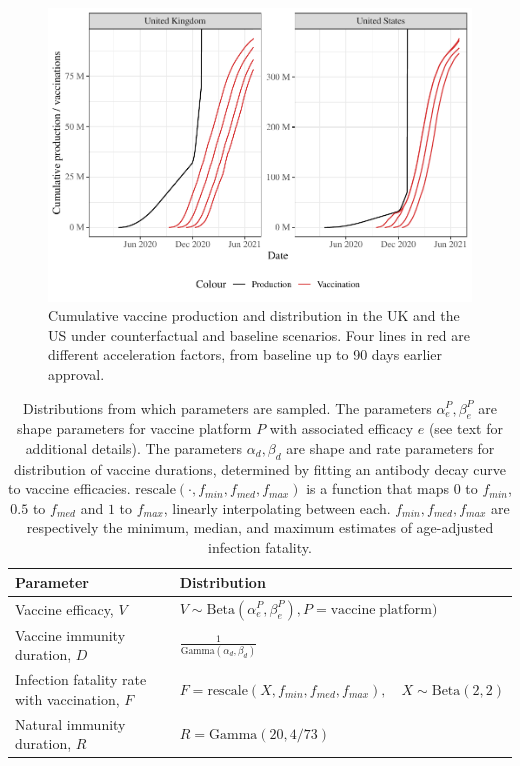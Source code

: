 \documentclass{article}
\begin{document}
\appendix


\setcounter{table}{0} \renewcommand{\thetable}{S\arabic{table}} \setcounter{figure}{0} \renewcommand{\thefigure}{S\arabic{figure}}

\begin{figure}[H]

{\centering \includegraphics[height=0.4\textheight,]{_main_files/figure-latex/prod-cap-1}

}

\caption{Cumulative vaccine production and distribution in the UK and the US under counterfactual and baseline scenarios. Four lines in red are different acceleration factors, from baseline up to 90 days earlier approval.}\label{fig:prod-cap}
\end{figure}

\begin{table}

\caption{\label{tab:trajectory-sampling-parameters}Distributions from which parameters are sampled. The parameters $\alpha_e^P, \beta_e^P$ are shape parameters for vaccine platform $P$ with associated efficacy $e$ (see text for additional details). The parameters $\alpha_d, \beta_d$ are shape and rate parameters for distribution of vaccine durations, determined by fitting an antibody decay curve to vaccine efficacies. $\mathrm{rescale}(\cdot, f_{min}, f_{med}, f_{max})$ is a function that maps $0$ to $f_{min}$, $0.5$ to $f_{med}$ and $1$ to $f_{max}$, linearly interpolating between each. $f_{min}, f_{med}, f_{max}$ are respectively the minimum, median, and maximum estimates of age-adjusted infection fatality.}
\centering
\begin{tabular}[t]{ll}
\toprule
Parameter & Distribution\\
\midrule
Vaccine efficacy, $V$ & $V\sim \mathrm{Beta}(\alpha_{e}^P, \beta_{e}^P), P = \mathrm{vaccine\; platform})$\\
Vaccine immunity duration, $D$ & $\frac{1}{\mathrm{Gamma}(\alpha_{d}, \beta_d)}$\\
Infection fatality rate with vaccination, $F$ & $F = \mathrm{rescale}(X,f_{min}, f_{med}, f_{max}), \quad X\sim \mathrm{Beta}(2,2)$\\
Natural immunity duration, $R$ & $R = \mathrm{Gamma}(20, 4/73)$\\
\bottomrule
\end{tabular}
\end{table}
\end{document}
